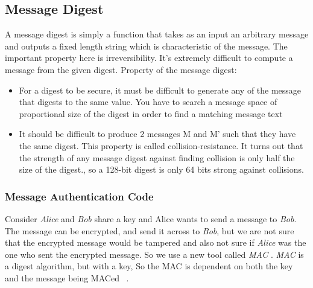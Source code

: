 \documentclass[12pt]{report}
\begin{document}
\subsection{Message Digest}
A message digest is simply a function that takes as an input an arbitrary message and outputs a fixed length string 
which is characteristic of the message. The important property here is irreversibility.  
It's extremely difficult to compute a message from the given digest. 
Property of the message digest: 
\begin{itemize}
    \item For a digest to be secure, it must be difficult to generate any of the message that digests to the same value. 
        You have to search a message space of proportional size of the digest in order to find a matching message text
    \item It should be difficult to produce 2 messages M and M' such that they have the same digest. 
        This property is called collision-resistance. It turns out that the strength of any message digest 
        against finding collision is only half the size of the digest., so a 128-bit digest is only 64 bits strong against collisions.
\end{itemize}
\subsubsection{Message Authentication Code}
Consider \textit{Alice} and \textit{Bob} share a key and Alice wants to send a message to \textit{Bob}. The message can be encrypted, 
and send it across to \textit{Bob}, but we are not sure that the encrypted message would be tampered and also not sure 
if \textit{Alice} was the one who sent the encrypted message.  So we use a new tool called \textit{MAC} . \textit{MAC} is a digest algorithm,
but with a key, So the MAC is dependent on both the key and the message being MACed ~\cite{eric}.
\end{document}
